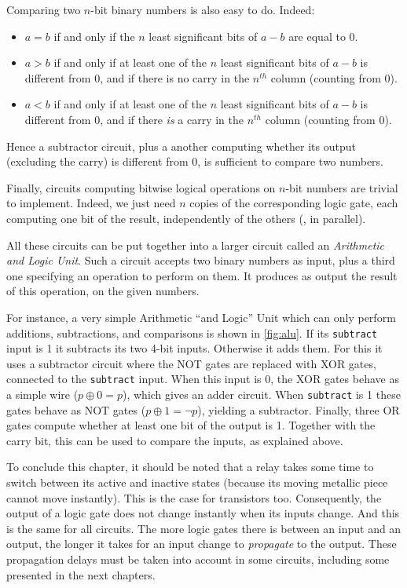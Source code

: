 Comparing two $n$-bit binary numbers is also easy to do. Indeed:
\begin{itemize}
  \item $a=b$ if and only if the $n$ least significant bits of $a-b$ are equal
  to 0.

  \item $a>b$ if and only if at least one of the $n$ least significant bits of
  $a-b$ is different from 0, and if there is no carry in the $n^{th}$ column
  (counting from 0).

  \item $a<b$ if and only if at least one of the $n$ least significant bits of
  $a-b$ is different from 0, and if there {\em is} a carry in the $n^{th}$
  column (counting from 0).
\end{itemize}
Hence a subtractor circuit, plus a another computing whether its output
(excluding the carry) is different from 0, is sufficient to compare two numbers.

Finally, circuits computing bitwise logical operations on $n$-bit numbers are
trivial to implement. Indeed, we just need $n$ copies of the corresponding
logic gate, each computing one bit of the result, independently of the others
(\ie, in parallel).

All these circuits can be put together into a larger circuit called an {\em
Arithmetic and Logic Unit}. Such a circuit accepts two binary numbers as input,
plus a third one specifying an operation to perform on them. It produces as
output the result of this operation, on the given numbers.

For instance, a very simple Arithmetic ``and Logic'' Unit which can only
perform additions, subtractions, and comparisons is shown in \cref{fig:alu}.
If its {\tt subtract} input is 1 it subtracts its two 4-bit inputs. Otherwise
it adds them. For this it uses a subtractor circuit where the NOT gates are
replaced with XOR gates, connected to the {\tt subtract} input. When this input
is 0, the XOR gates behave as a simple wire ($p \oplus 0 = p$), which gives an
adder circuit. When {\tt subtract} is 1 these gates behave as NOT gates ($p
\oplus 1 = \neg p$), yielding a subtractor. Finally, three OR gates compute
whether at least one bit of the output is 1. Together with the carry bit, this
can be used to compare the inputs, as explained above.

To conclude this chapter, it should be noted that a relay takes some time to
switch between its active and inactive states (because its moving metallic
piece cannot move instantly). This is the case for transistors too.
Consequently, the output of a logic gate does not change instantly when its
inputs change. And this is the same for all circuits. The more logic gates
there is between an input and an output, the longer it takes for an input
change to {\em propagate} to the output. These propagation delays must be taken
into account in some circuits, including some presented in the next chapters.
